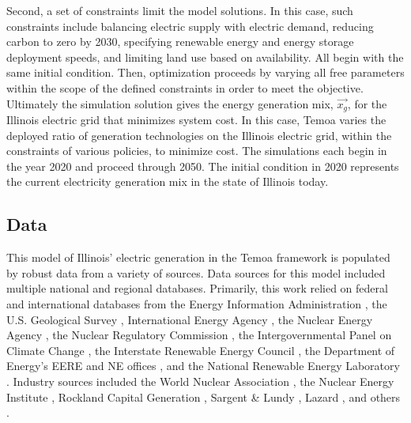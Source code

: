 Second, a set of constraints limit the model solutions. In this case, such 
constraints include balancing electric supply with electric demand, reducing 
carbon to zero by 2030, specifying renewable energy and energy
storage deployment speeds, and limiting land use based on availability.
All begin with the same initial condition. 
Then, optimization 
proceeds by varying all free parameters within the scope of the defined 
constraints in order to meet the objective. Ultimately the simulation solution 
gives the energy generation mix, $\vec{x_g}$, for the Illinois electric grid that minimizes system cost. 
In this case, Temoa varies the 
deployed ratio of generation technologies on the Illinois electric grid, within 
the constraints of various policies, to minimize cost. The simulations each 
begin in the year 2020 and proceed through 2050. The initial condition in 2020 
represents the current electricity generation mix in the state of Illinois 
today.

\FloatBarrier
\subsection{Data}

This model of Illinois' electric generation in the 
Temoa framework
is populated by robust data from a variety of sources.
Data sources for this model included multiple national and regional 
databases. Primarily, this work relied on federal and international databases from the 
Energy Information Administration 
\cite{us_energy_information_administration_eia_preliminary_2021,energy_information_administration_state_2020,us_energy_information_administration_eia_electric_2021,us_energy_information_administration_eia_illinois_2020}, 
the U.S. Geological Survey \cite{hoen_united_2018}, 
International Energy Agency \cite{lorenczik_projected_2020}, 
the Nuclear Energy Agency \cite{crozat_full_2018}, 
the Nuclear Regulatory Commission 
\cite{united_states_nuclear_regulatory_commission_illinois_2020}, 
the Intergovernmental Panel on Climate Change 
\cite{intergovernmental_panel_on_climate_change_annex_2014,intergovernmental_panel_on_climate_change_climate_2014,intergovernmental_panel_on_climate_change_climate_2014-1,intergovernmental_panel_on_climate_change_climate_2014-2},
the Interstate Renewable Energy Council 
\cite{sherwood_us_2009,sherwood_us_2010,sherwood_us_2011,brown_solid_1996,sherwood_us_2012,sherwood_us_2013,sherwood_us_2014}, 
the Department of Energy's EERE and NE offices 
\cite{us_department_of_energy_capital_2016}, and the National Renewable Energy 
Laboratory 
\cite{nrel_national_renewable_energy_laboratory_2020_2020,sengupta_national_2018}.
Industry sources included the World Nuclear Association
\cite{world_nuclear_association_nuclear_2017}
, 
the Nuclear Energy Institute 
\cite{desai_nuclear_2018,desai_nuclear_2020,murphy_impacts_2019,tessum_air_2019},
Rockland Capital Generation \cite{rockland_capital_natural_2021},
Sargent \& Lundy \cite{sargent__lundy_capital_2020}, 
Lazard \cite{ray_lazards_2020},
and others 
\cite{the_solar_foundation_national_2020,solar_energy_industries_association_illinois_2020,rutovitz_calculating_2015}.


